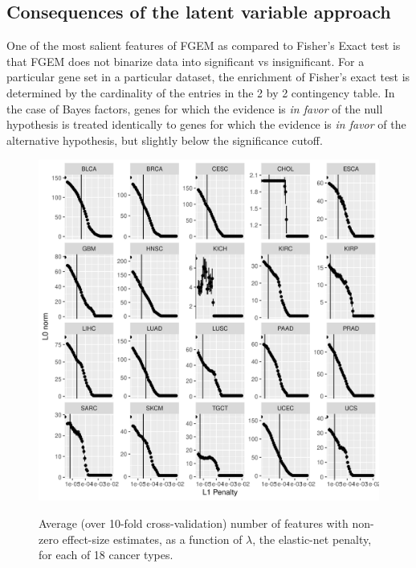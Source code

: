 \subsection{Consequences of the latent variable approach}
\label{sec:orgc636833}

One of the most salient features of FGEM as compared to Fisher's Exact test is that FGEM does not binarize data into significant vs insignificant.  For a particular gene set in a particular dataset,
the enrichment of Fisher's exact test is determined by the cardinality of the entries in the 2 by 2 contingency table.  In the case of Bayes factors, genes for which the evidence is \emph{in favor} of the null hypothesis is treated identically to genes for which the evidence is \emph{in favor} of the alternative hypothesis, but slightly below the significance cutoff. 




\begin{figure}
    \centering
    \includegraphics[width=.9\linewidth]{img/cv_l0.png}
    \label{fig:cv_l0}
    \caption{Average (over 10-fold cross-validation) number of features with non-zero effect-size estimates, as a function of $\lambda$, the elastic-net penalty, for each of 18 cancer types.}
\end{figure}



